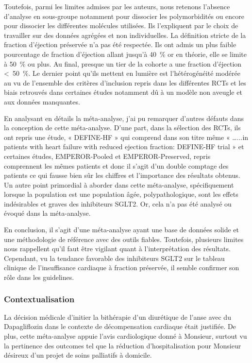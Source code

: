 Toutefois, parmi les limites admises par les auteurs, nous retenons l’absence d’analyse en sous-groupe notamment pour dissocier les polymorbidités ou encore pour dissocier les différentes molécules utilisées. Ils l’expliquent par le choix de travailler sur des données agrégées et non individuelles. La définition stricte de la fraction d’éjection préservée n’a pas été respectée. Ils ont admis un plus faible pourcentage de fraction d’éjection allant jusqu’à \qty{40}{\percent} or en théorie, elle se limite à \qty{50}{\percent} ou plus. Au final, presque un tier de la cohorte a une fraction d’éjection <~\qty{50}{\percent}. Le dernier point qu’ils mettent en lumière est l’hétérogénéité modérée au vu de l’ensemble des critères d’inclusion repris dans les différentes RCTs et les biais retrouvés dans certaines études notamment dû à un modèle non aveugle et aux données manquantes.

En analysant en détails la méta-analyse, j’ai pu remarquer d’autres défauts dans la conception de cette méta-analyse. D’une part, dans la sélection des RCTs, ils ont repris une étude, « DEFINE-HF » qui comprend dans son titre même « …...in patients with heart failure with reduced ejection fraction: DEFINE-HF trial » et certaines études, EMPEROR-Pooled et EMPEROR-Preserved, repris comprennent les mêmes patients et donc il s’agit d’un double comptage des patients ce qui fausse bien sûr les chiffres et l’importance des résultats obtenus. Un autre point primordial à aborder dans cette méta-analyse, spécifiquement lorsque la population est une population âgée, polypathologique, sont les effets indésirables et graves des inhibiteurs SGLT2. Or, cela n’a pas été analysé ou évoqué dans la méta-analyse.

En conclusion, il s’agit d’une méta-analyse ayant une base de données solide et une méthodologie de référence avec des outils fiables. Toutefois, plusieurs limites nous rappellent qu’il faut être vigilant quant à l’interprétation des résultats. Cependant, vu la tendance favorable des inhibiteurs SGLT2 sur le tableau clinique de l’insuffisance cardiaque à fraction préservée, il semble confirmer son rôle dans les guidelines. 

\subsubsection{Contextualisation} 
La décision médicale d’initier la bithérapie d’un diurétique de l’anse avec du Dapagliflozin dans le contexte de décompensation cardiaque était justifiée. De plus, cette méta-analyse appuie l’avis cardiologique donné à Monsieur, surtout vu la pertinence des outcomes tel que la réduction d’hospitalisation pour Monsieur désireux d’un projet de soins palliatifs à domicile.

